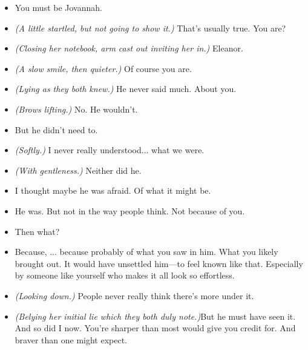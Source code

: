\begin{itemize}
    \item[\textbf{Eleanor:}] You must be Jovannah.

    \item[\textbf{Jovannah:}] \textit{(A little startled, but not going to show it.)} That’s usually true. You are?
\end{itemize}

\begin{itemize}
    \item[\textbf{Eleanor:}] \textit{(Closing her notebook, arm cast out inviting her in.)} Eleanor.

    \item[\textbf{Jovannah:}] \textit{(A slow smile, then quieter.)} Of course you are.

    \item[\textbf{Eleanor:}] \textit{(Lying as they both knew.)} He never said much. About you.

    \item[\textbf{Jovannah:}] \textit{(Brows lifting.)} No. He wouldn’t.

    \item[\textbf{Eleanor:}] But he didn’t need to.

    \item[\textbf{Jovannah:}] \textit{(Softly.)} I never really understood... what we were.

    \item[\textbf{Eleanor:}] \textit{(With gentleness.)} Neither did he.

    \item[\textbf{Jovannah:}] I thought maybe he was afraid. Of what it might be.

    \item[\textbf{Eleanor:}] He was. But not in the way people think. Not because of you.

    \item[\textbf{Jovannah:}] Then what?

    \item[\textbf{Eleanor:}] Because, ... because probably of what you saw in him. What you likely brought out. It would have unsettled him—to feel known like that. Especially by someone like yourself who makes it all look so effortless.

    \item[\textbf{Jovannah:}] \textit{(Looking down.)} People never really think there’s more under it.

    \item[\textbf{Eleanor:}] \textit{(Belying her initial lie which they both duly note.)}But he must have seen it. And so did I now. You’re sharper than most would give you credit for. And braver than one might expect.


\end{itemize}
